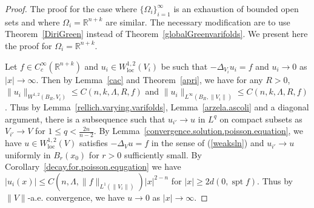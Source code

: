 \documentclass[11pt]{amsart}
\theoremstyle{definition}
\newcommand{\R}{\mathbb{R}}
\newcommand{\loc}{\mathrm{loc}}
\DeclareMathOperator{\spt}{spt}
\begin{document}
\begin{proof}
    The proof for the case where $\{\Omega_i\}_{i=1}^\infty$ is an exhaustion of bounded open sets and where $\Omega_i=\R^{n+k}$ are similar. The necessary modification are to use Theorem~\ref{DiriGreen} instead of Theorem~\ref{globalGreenvarifolds}. We present here the proof for $\Omega_i=\R^{n+k}$.
    
	Let $f\in C_c^\infty(\R^{n+k})$ and $u_i\in W^{1,2}_\loc(V_i)$ be such that $-\Delta_{V_i} u_i=f$ and $u_i\to0$ as $|x|\to\infty$. Then by Lemma~\ref{cac} and Theorem~\ref{apri}, we have for any $R>0$, $\|u_i\|_{W^{1,2}(B_R,V_i)}\le C(n,k,\Lambda,R,f)$ and $\|u_i\|_{L^{\infty}(B_R,\|V_i\|)}\le C(n,k,\Lambda,R,f)$.  Thus by Lemma~\ref{rellich.varying.varifolds}, Lemma~\ref{arzela.ascoli} and a diagonal argument, there is a subsequence such that $u_{i'}\to u$ in $L^{q}$ on compact subsets as $V_{i'}\to V$ for $1\le q<\frac{2n}{n-2}$.
    By Lemma~\ref{convergence.solution.poisson.equation}, we have $u\in W^{1,2}_\loc(V)$ satisfies $-\Delta _V u=f$ in the sense of (\ref{weaksln}) and $u_{i'}\to u$ uniformly in $B_r(x_0)$ for $r>0$ sufficiently small. By Corollary~\ref{decay.for.poisson.equgation} we have $|u_i(x)|\le C(n,\Lambda,\|f\|_{L^1(\|V_i\|)})|x|^{2-n}$ for $|x|\ge 2d(0,\spt f)$. Thus by $\|V\|$-a.e. convergence, we have $u\to 0$ as $|x|\to\infty$.
	

\end{proof}
\end{document}
